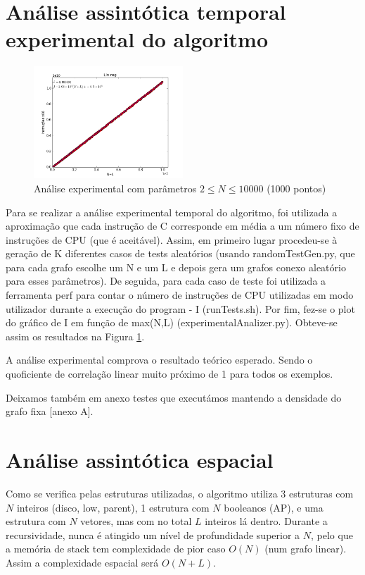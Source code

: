 \documentclass{scrartcl}
\begin{document}
\section*{Análise assintótica temporal experimental do algoritmo}
\begin{figure} %
	\centering
	\includegraphics[width=0.5\textwidth]{../images/analiseExp_1e5.png}
	\caption{Análise experimental com parâmetros $2 \le N \le 10000 $ (1000 pontos)}
	\label{fig:analexp}
\end{figure}
Para se realizar a análise experimental temporal do algoritmo, foi utilizada a aproximação que cada instrução de C corresponde em média a um número fixo de instruções de CPU (que é aceitável). Assim, em primeiro lugar procedeu-se à geração de K diferentes casos de tests aleatórios (usando randomTestGen.py, que para cada grafo escolhe um N e um L e depois gera um grafos conexo aleatório para esses parâmetros). De seguida, para cada caso de teste foi utilizada a ferramenta perf para contar o número de instruções de CPU utilizadas em modo utilizador durante a execução do program - I (runTests.sh). Por fim, fez-se o plot do gráfico de I em função de max(N,L) (experimentalAnalizer.py). Obteve-se assim os resultados na Figura \ref{fig:analexp}.\par
A análise experimental comprova o resultado teórico esperado. Sendo o quoficiente de correlação linear muito próximo de 1 para todos os exemplos.\par
Deixamos também em anexo testes que executámos mantendo a densidade do grafo fixa [anexo A].
\section*{Análise assintótica espacial}
Como se verifica pelas estruturas utilizadas, o algoritmo utiliza 3 estruturas com $N$ inteiros (disco, low, parent), 1 estrutura com $N$ booleanos (AP), e uma estrutura com $N$ vetores, mas com no total $L$ inteiros lá dentro. Durante a recursividade, nunca é atingido um nível de profundidade superior a $N$, pelo que a memória de stack tem complexidade de pior caso $O(N)$ (num grafo linear). Assim a complexidade espacial será $O(N+L)$.
\end{document}
